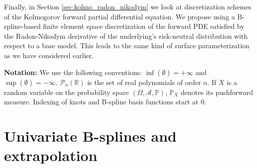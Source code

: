 \documentclass[a4paper]{article}
\newcommand{\1}{\textbf{1}}
\newcommand{\R}{\mathbb{R}}
\newcommand{\PP}{\mathbb{P}}
\begin{document}
\par Finally, in Section \ref{sec:kolmo_radon_nikodym} we look at discretization schemes of the Kolmogorov forward partial differential equation. We propose using a B-spline-based finite element space discretization of the forward PDE satisfied by the Radon-Nikodym derivative of the underlying's risk-neutral distribution with respect to a base model. This leads to the same kind of surface parameterization as we have considered earlier.
\vspace{2mm}
\par \noindent \textbf{Notation:} We use the following conventions: $\inf(\emptyset) = +\infty$ and $\sup(\emptyset) = -\infty$. $\mathcal{P}_n(\R)$ is the set of real polynomials of order $n$. If $X$ is a random variable on the probability space $(\Omega, \mathcal{A}, \PP)$, $\PP_X$ denotes its pushforward measure. Indexing of knots and B-spline basis functions start at $0$.
\section{Univariate B-splines and extrapolation}\label{sec:spline_section}
\end{document}
